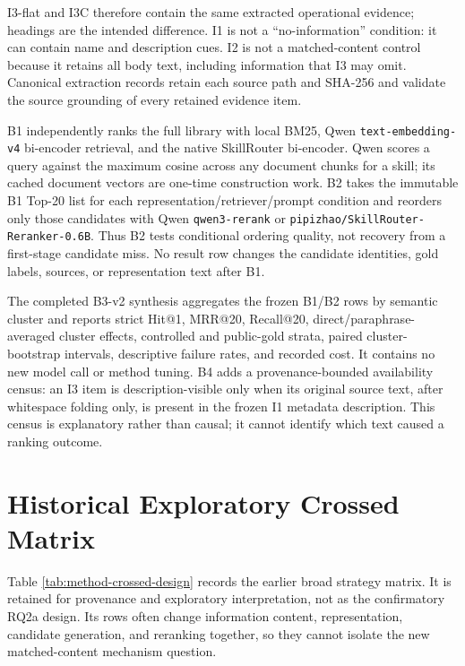 I3-flat and I3C therefore contain the same extracted operational evidence; headings are the intended difference. I1 is not a ``no-information'' condition: it can contain name and description cues. I2 is not a matched-content control because it retains all body text, including information that I3 may omit. Canonical extraction records retain each source path and SHA-256 and validate the source grounding of every retained evidence item.

B1 independently ranks the full library with local BM25, Qwen \texttt{text-embedding-v4} bi-encoder retrieval, and the native SkillRouter bi-encoder. Qwen scores a query against the maximum cosine across any document chunks for a skill; its cached document vectors are one-time construction work. B2 takes the immutable B1 Top-20 list for each representation/retriever/prompt condition and reorders only those candidates with Qwen \texttt{qwen3-rerank} or \texttt{pipizhao/SkillRouter-Reranker-0.6B}. Thus B2 tests conditional ordering quality, not recovery from a first-stage candidate miss. No result row changes the candidate identities, gold labels, sources, or representation text after B1.

The completed B3-v2 synthesis aggregates the frozen B1/B2 rows by semantic cluster and reports strict Hit@1, MRR@20, Recall@20, direct/paraphrase-averaged cluster effects, controlled and public-gold strata, paired cluster-bootstrap intervals, descriptive failure rates, and recorded cost. It contains no new model call or method tuning. B4 adds a provenance-bounded availability census: an I3 item is description-visible only when its original source text, after whitespace folding only, is present in the frozen I1 metadata description. This census is explanatory rather than causal; it cannot identify which text caused a ranking outcome.

\section{Historical Exploratory Crossed Matrix}

Table \ref{tab:method-crossed-design} records the earlier broad strategy matrix. It is retained for provenance and exploratory interpretation, not as the confirmatory RQ2a design. Its rows often change information content, representation, candidate generation, and reranking together, so they cannot isolate the new matched-content mechanism question.

